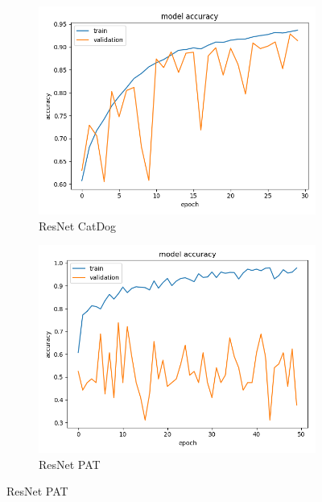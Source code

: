 \begin{figure}
\begin{subfigure}[b]{.45\linewidth}
\includegraphics[width=\linewidth]{Figs/resnet_catdog_acc.jpg}
\caption{ResNet CatDog}
\end{subfigure}
\begin{subfigure}[b]{.45\linewidth}
\includegraphics[width=\linewidth]{Figs/resnet_pat_acc.jpg}
\caption{ResNet PAT}
\end{subfigure}


\end{figure}
